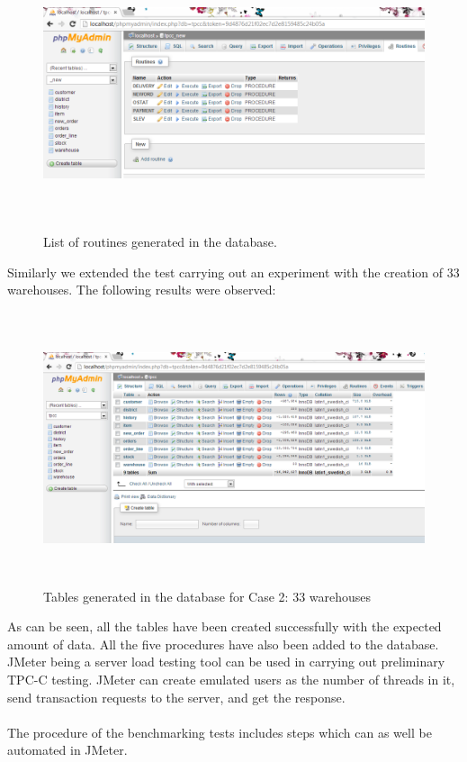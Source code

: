 \documentclass[12pt]{book}
\begin{document}
  \begin{figure}[H]
    \centering
    \includegraphics[width=15cm, height=8cm]{images/ntpcc_84}
    \caption{List of routines generated in the database.\label{fig:fig68_JMeter}}
  \end{figure} 
  
  Similarly we extended the test carrying out an experiment with the creation of 33 warehouses. The following results were observed:
  
    
  \begin{figure}[H]
    \centering
    \includegraphics[width=15cm, height=8cm]{images/ntpcc_85}
    \caption{Tables generated in the database for Case 2: 33 warehouses\label{fig:fig69_JMeter}}
  \end{figure} 
  
  As can be seen, all the tables have been created successfully with the expected amount of data.
  All the five procedures have also been added to the database.\\
  JMeter being a server load testing tool can be used in carrying out preliminary TPC-C testing. JMeter can create emulated users as the number of threads in it, 
  send transaction requests to the server, and get the response.\\
  \\The procedure of the benchmarking tests includes steps which can as well be automated in JMeter. \\
\end{document}
